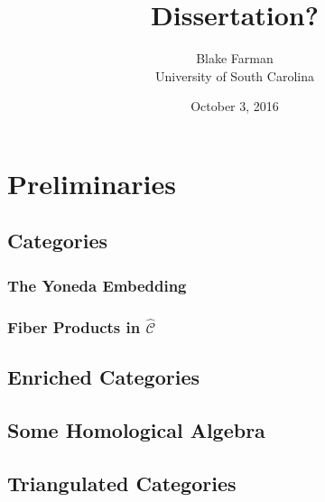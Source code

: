 \usepackage{mystyle}
\usepackage{style}

\openup 5pt
\author{Blake Farman\\University of South Carolina}
\title{Dissertation?}
\date{October 3, 2016}
\pdfpagewidth 8.5in
\pdfpageheight 11in



\maketitle

\tableofcontents

\newtheorem{thm}{Theorem}[section]
\newtheorem{lem}[thm]{Lemma}
\newtheorem{cor}[thm]{Corollary}
\newtheorem{prop}[thm]{Proposition}

\theoremstyle{definition}
\newtheorem{defn}[thm]{Definition}
\newtheorem{rmk}[thm]{Remark}
\newtheorem{eg}[thm]{Example}

\chapter{Preliminaries}
\section{Categories}

\subsection{The Yoneda Embedding}
\subsection{Fiber Products in $\hat{\mathscr{C}}$} %

\section{Enriched Categories}



\section{Some Homological Algebra}

\section{Triangulated Categories}


